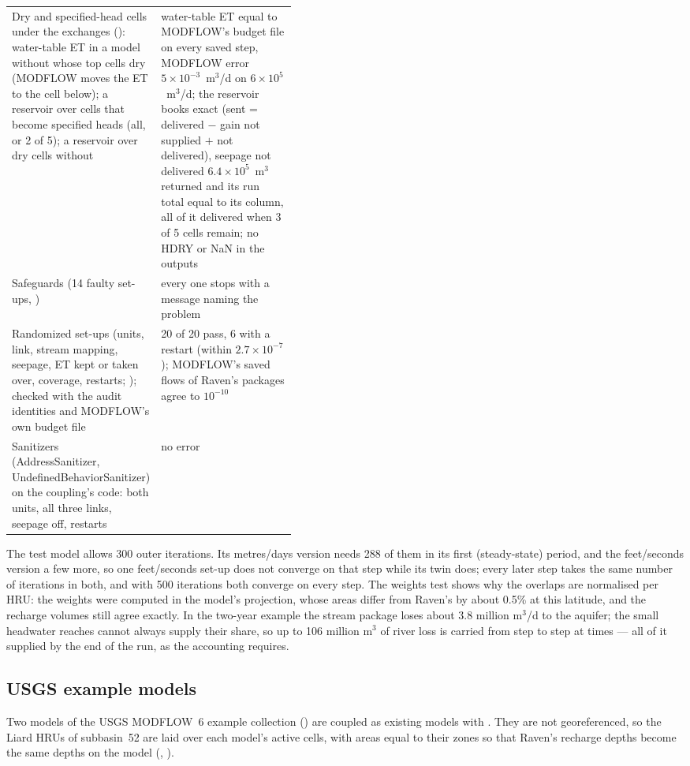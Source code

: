 \begin{table}[!htbp]
\begin{tabularx}{\linewidth}{P{0.42\linewidth}Y}
Dry and specified-head cells under the exchanges (): water-table ET in a model without  whose top cells dry (MODFLOW moves the ET to the cell below); a reservoir over cells that become specified heads (all, or 2 of 5); a reservoir over dry cells without  & water-table ET equal to MODFLOW's budget file on every saved step, MODFLOW error $5\times10^{-3}$~m$^3$/d on $6\times10^{5}$~m$^3$/d; the reservoir books exact (sent = delivered $-$ gain not supplied $+$ not delivered), seepage not delivered $6.4\times10^{5}$~m$^3$ returned and its run total equal to its column, all of it delivered when 3 of 5 cells remain; no HDRY or NaN in the outputs\\
Safeguards (14 faulty set-ups, ) & every one stops with a message naming the problem\\
Randomized set-ups (units, link, stream mapping, seepage, ET kept or taken over, coverage, restarts; ); checked with the audit identities and MODFLOW's own budget file & 20 of 20 pass, 6 with a restart (within $2.7\times10^{-7}$); MODFLOW's saved flows of Raven's packages agree to $10^{-10}$\\
Sanitizers (AddressSanitizer, UndefinedBehaviorSanitizer) on the coupling's code: both units, all three links, seepage off, restarts & no error\\\bottomrule
\end{tabularx}
\end{table}
The test model allows 300 outer iterations. Its metres/days version needs 288 of them in its first (steady-state)
period, and the feet/seconds version a few more, so one feet/seconds set-up does not converge on that step while its twin
does; every later step takes the same number of iterations in both, and with 500 iterations both converge on every step.
The weights test shows why the overlaps are normalised per HRU: the weights were computed in the model's projection, whose
areas differ from Raven's by about 0.5\% at this latitude, and the recharge volumes still agree exactly. In the two-year
example the stream package loses about 3.8 million m$^3$/d to the aquifer; the small headwater reaches cannot always supply
their share, so up to 106 million m$^3$ of river loss is carried from step to step at times --- all of it supplied by the end
of the run, as the accounting requires.

\subsection{USGS example models}\label{sec:usgs}
Two models of the USGS MODFLOW~6 example collection () are coupled as existing models with
. They are not georeferenced, so the Liard HRUs of subbasin~52 are laid over each model's active cells,
with  areas equal to their zones so that Raven's recharge depths become the same depths on the model
(, ).

